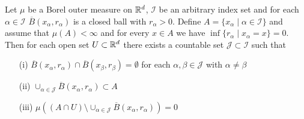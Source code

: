 \begin{cor}\label{BesicovichFilling}Let $\mu$ be a Borel outer measure on $\mathbb{R}^d$, $\mathcal{I}$ be an arbitrary index set and
for each $\alpha \in \mathcal{I}$ $\overline{B}(x_\alpha, r_\alpha)$ is a closed ball with $r_\alpha > 0$.  Define $A = \lbrace x_\alpha \mid \alpha \in \mathcal{I} \rbrace$
and assume that $\mu(A) < \infty$ and for every $x \in A$ we have $\inf \lbrace r_\alpha \mid x_\alpha = x \rbrace = 0$.  Then for each open set $U \subset \mathbb{R}^d$ 
there exists a countable set $\mathcal{J} \subset \mathcal{I}$ such that 
\begin{itemize}
\item[(i)]$\overline{B}(x_\alpha, r_\alpha) \cap \overline{B}(x_\beta, r_\beta) = \emptyset$ for each $\alpha, \beta \in \mathcal{J}$ with $\alpha \neq \beta$
\item[(ii)]$\cup_{\alpha \in \mathcal{J}} \overline{B} (x_\alpha, r_\alpha) \subset A$
\item[(iii)]$\mu \left( (A \cap U) \setminus \cup_{\alpha \in \mathcal{J}} \overline{B} (x_\alpha, r_\alpha) \right) = 0$
\end{itemize}
\end{cor}
